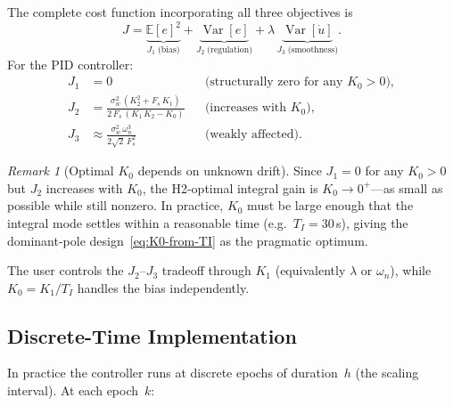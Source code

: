 \documentclass[11pt, a4paper]{article}
\theoremstyle{definition}
\theoremstyle{plain}
\theoremstyle{remark}
\newtheorem{remark}{Remark}[section]
\newcommand{\E}{\mathbb{E}}
\newcommand{\Var}{\operatorname{Var}}
\begin{document}
The complete cost function incorporating all three objectives is
\begin{equation}\label{eq:full-cost}
  J = \underbrace{\E[e]^2}_{J_1\;\text{(bias)}}
    + \underbrace{\Var[e]}_{J_2\;\text{(regulation)}}
    + \lambda\,\underbrace{\Var[\dot{u}]}_{J_3\;\text{(smoothness)}}.
\end{equation}
For the PID controller:
\begin{align}
  J_1 &= 0  &&\text{(structurally zero for any $K_0 > 0$)},\\
  J_2 &= \frac{\sigma_w^2\,(K_2^2 + F_s\,K_1)}
              {2\,F_s\,(K_1\,K_2 - K_0)}
       &&\text{(increases with $K_0$)},\\
  J_3 &\approx \frac{\sigma_w^2\,\omega_n^3}{2\sqrt{2}\,F_s^2}
       &&\text{(weakly affected)}.
\end{align}

\begin{remark}[Optimal $K_0$ depends on unknown drift]
  Since $J_1 = 0$ for any $K_0 > 0$ but $J_2$ increases with $K_0$,
  the H2-optimal integral gain is $K_0 \to 0^+$---as small as
  possible while still nonzero.  In practice, $K_0$ must be large
  enough that the integral mode settles within a reasonable time
  (e.g.\ $T_I = 30$\,s), giving the dominant-pole
  design~\eqref{eq:K0-from-TI} as the pragmatic optimum.
\end{remark}

The user controls the $J_2$--$J_3$ tradeoff through $K_1$
(equivalently $\lambda$ or $\omega_n$), while $K_0 = K_1/T_I$
handles the bias independently.

\subsection{Discrete-Time Implementation}\label{sec:implementation}

In practice the controller runs at discrete epochs of
duration~$h$ (the scaling interval).  At each epoch~$k$:
\end{document}

